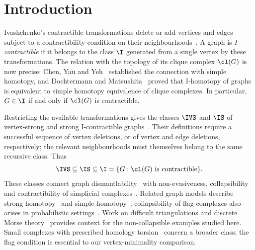 \section{Introduction}\label{sec:intro}

Ivashchenko's contractible transformations delete or add vertices and edges subject to a contractibility condition on their neighbourhoods~\cite{Ivashchenko1993,Ivashchenko1994a,Ivashchenko1994b}. A graph is \emph{I-contractible} if it belongs to the class $\I$ generated from a single vertex by these transformations. The relation with the topology of its clique complex $\cl(G)$ is now precise: Chen, Yau and Yeh~\cite{ChenYauYeh2001} established the connection with simple homotopy, and Dochtermann and Matsushita~\cite{DochtermannMatsushita2025} proved that I-homotopy of graphs is equivalent to simple homotopy equivalence of clique complexes. In particular, $G\in\I$ if and only if $\cl(G)$ is contractible.

Restricting the available transformations gives the classes $\IVS$ and $\IS$ of vertex-strong and strong I-contractible graphs~\cite{DEFH2023}. Their definitions require a successful sequence of vertex deletions, or of vertex and edge deletions, respectively; the relevant neighbourhoods must themselves belong to the same recursive class. Thus
\[
 \IVS\subseteq\IS\subseteq\I
 =\{G:\cl(G)\text{ is contractible}\}.
\]
These classes connect graph dismantlability~\cite{FieuxJouve2020} with non-evasiveness, collapsibility and contractibility of simplicial complexes~\cite{Jonsson2008,Cohen1973,EFH2022}. Related graph models describe strong homotopy~\cite{BarmakMinian2012} and simple homotopy~\cite{BouletFieuxJouve2010,BouletFieuxJouve2020corr}; collapsibility of flag complexes also arises in probabilistic settings~\cite{Malen2023}. Work on difficult triangulations and discrete Morse theory~\cite{BenedettiLutz2014} provides context for the non-collapsible examples studied here. Small complexes with prescribed homology torsion~\cite{Newman2019} concern a broader class; the flag condition is essential to our vertex-minimality comparison.

